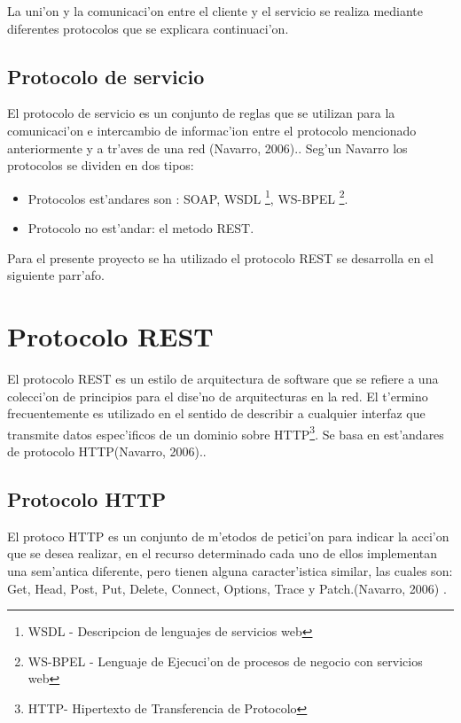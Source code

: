 
La uni'on y la comunicaci'on entre el cliente y el servicio se realiza mediante diferentes  protocolos que se explicara continuaci'on.

\subsection{Protocolo de servicio}
El protocolo de servicio es un conjunto de reglas que se utilizan para la comunicaci'on e intercambio de informac'ion entre el protocolo mencionado anteriormente y a tr'aves de una red (Navarro, 2006).\cite{Navarro2006}. 
Seg'un Navarro los protocolos se dividen en dos tipos:
\begin{itemize}
\item Protocolos est'andares son : SOAP, WSDL \footnote{WSDL - Descripcion de lenguajes de servicios web}, WS-BPEL \footnote{WS-BPEL - Lenguaje de Ejecuci'on de procesos de negocio con servicios web}.
\item Protocolo no est'andar: el metodo REST.
\end{itemize}
 
Para el presente proyecto se ha utilizado el protocolo  REST se desarrolla en el siguiente parr'afo.

\section{Protocolo REST} 
El protocolo REST es un estilo de arquitectura de software que se refiere a una colecci'on de principios para el dise'no de arquitecturas en la red. El t'ermino frecuentemente es utilizado en el sentido de describir a cualquier interfaz que transmite datos espec'ificos de un dominio sobre HTTP\footnote{ HTTP- Hipertexto de Transferencia de Protocolo}. Se basa en est'andares de protocolo HTTP(Navarro, 2006).\cite{Navarro2006}.

\subsection{Protocolo HTTP}

El protoco HTTP es un conjunto de m'etodos de petici'on para indicar la acci'on que se desea realizar, en el recurso determinado cada uno de ellos implementan una sem'antica diferente, pero tienen alguna caracter'istica similar, las cuales son: Get, Head, Post, Put, Delete, Connect, Options, Trace y Patch.(Navarro, 2006) \cite{Navarro2006}. 

